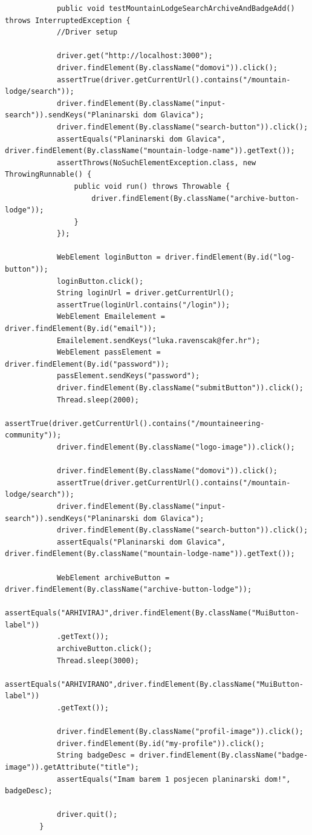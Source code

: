  		\begin{lstlisting}
 			public void testMountainLodgeSearchArchiveAndBadgeAdd() throws InterruptedException {
 			//Driver setup
 			
 			driver.get("http://localhost:3000");
 			driver.findElement(By.className("domovi")).click();
 			assertTrue(driver.getCurrentUrl().contains("/mountain-lodge/search"));
 			driver.findElement(By.className("input-search")).sendKeys("Planinarski dom Glavica");	    
 			driver.findElement(By.className("search-button")).click();
 			assertEquals("Planinarski dom Glavica", driver.findElement(By.className("mountain-lodge-name")).getText());
 			assertThrows(NoSuchElementException.class, new ThrowingRunnable() {
 				public void run() throws Throwable {
 					driver.findElement(By.className("archive-button-lodge"));
 				}
 			});
 			
 			WebElement loginButton = driver.findElement(By.id("log-button"));
 			loginButton.click();
 			String loginUrl = driver.getCurrentUrl();
 			assertTrue(loginUrl.contains("/login"));
 			WebElement Emailelement = driver.findElement(By.id("email"));        
 			Emailelement.sendKeys("luka.ravenscak@fer.hr");   
 			WebElement passElement = driver.findElement(By.id("password"));
 			passElement.sendKeys("password");
 			driver.findElement(By.className("submitButton")).click();
 			Thread.sleep(2000);
 			assertTrue(driver.getCurrentUrl().contains("/mountaineering-community"));
 			driver.findElement(By.className("logo-image")).click();
 			
 			driver.findElement(By.className("domovi")).click();
 			assertTrue(driver.getCurrentUrl().contains("/mountain-lodge/search"));
 			driver.findElement(By.className("input-search")).sendKeys("Planinarski dom Glavica");	    
 			driver.findElement(By.className("search-button")).click();
 			assertEquals("Planinarski dom Glavica", driver.findElement(By.className("mountain-lodge-name")).getText());
 			
 			WebElement archiveButton = driver.findElement(By.className("archive-button-lodge"));
 			assertEquals("ARHIVIRAJ",driver.findElement(By.className("MuiButton-label"))
 			.getText());
 			archiveButton.click();
 			Thread.sleep(3000);
 			assertEquals("ARHIVIRANO",driver.findElement(By.className("MuiButton-label"))
 			.getText());
 			
 			driver.findElement(By.className("profil-image")).click();
 			driver.findElement(By.id("my-profile")).click();
 			String badgeDesc = driver.findElement(By.className("badge-image")).getAttribute("title");
 			assertEquals("Imam barem 1 posjecen planinarski dom!", badgeDesc);
 			
 			driver.quit();
 		}
 		\end{lstlisting}
 	
